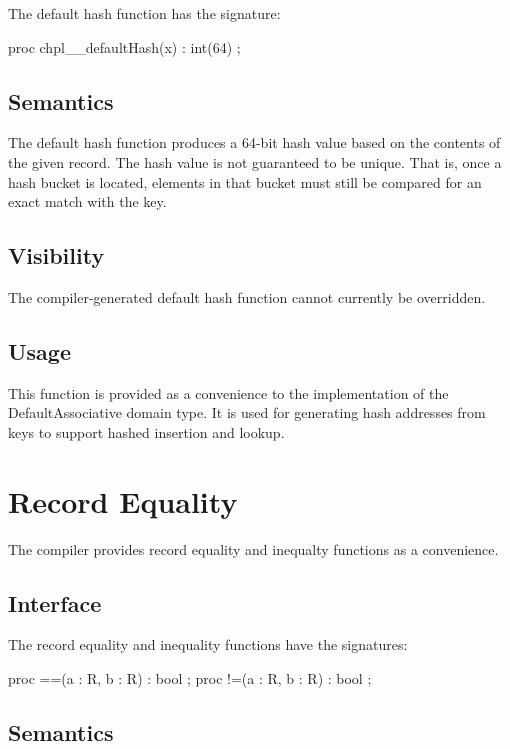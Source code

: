 The default hash function has the signature:
\begin{chapel}
proc chpl__defaultHash(x) : int(64) ;
\end{chapel}

\subsection{Semantics}

The default hash function produces a 64-bit hash value based on the contents of the given
record.  The hash value is not guaranteed to be unique.  That is, once a hash bucket is
located, elements in that bucket must still be compared for an exact match with the key.

\subsection{Visibility}

The compiler-generated default hash function cannot currently be overridden.

\subsection{Usage}

This function is provided as a convenience to the implementation of the DefaultAssociative
domain type.  It is used for generating hash addresses from keys to support hashed
insertion and lookup.


\section{Record Equality}

The compiler provides record equality \chpl{==} and inequalty \chpl{!=} functions as a
convenience.

\subsection{Interface}

The record equality and inequality functions have the signatures:
\begin{chapel}
proc ==(a : R, b : R) : bool ;
proc !=(a : R, b : R) : bool ;
\end{chapel}

\subsection{Semantics}

